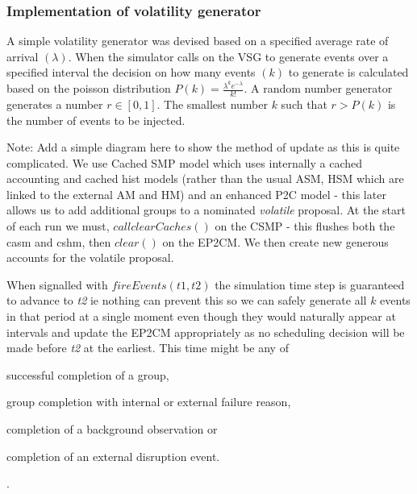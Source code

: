 \subsubsection{Implementation of volatility generator}
A simple volatility generator was devised based on a specified average rate of arrival $(\lambda)$. When the simulator calls on the VSG to generate events over a specified interval the decision on how many events $(k)$ to generate is calculated based on the poisson distribution $P(k) = \frac{\lambda^k e^{-\lambda}}{k!}$. A random number generator generates a number $r \in [0,1]$. The smallest number $k$ such that $r > P(k)$ is the number of events to be injected.

Note: Add a simple diagram here to show the method of update as this is quite complicated. We use Cached SMP model which uses internally a cached accounting and cached hist models (rather than the usual ASM, HSM which are linked to the external AM and HM) and an enhanced P2C model - this later allows us to add additional groups to a nominated \emph{volatile} proposal. At the start of each run we must, $call clearCaches()$ on the CSMP - this flushes both the casm and cshm, then $clear()$ on the EP2CM. We then create new generous accounts for the volatile proposal. 

When signalled with $fireEvents(t1, t2)$ the simulation time step is guaranteed to advance to \emph{t2} ie nothing can prevent this so we can safely generate all $k$ events in that period at a single moment even though they would naturally appear at intervals and update the EP2CM appropriately as no scheduling decision will be made before \emph{t2} at the earliest. This time might be any of \begin{inparaenum}  \item successful completion of a group, \item group completion with internal or external failure reason, \item completion of a background observation or \item completion of an external disruption event. \end{inparaenum}.

